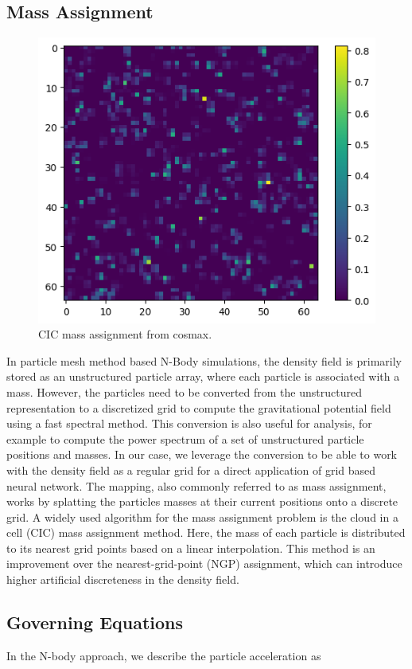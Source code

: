 \documentclass{article}
\begin{document}
\subsection{Mass Assignment}
\label{mass-assignment}

\begin{figure}[h]
    \centering
    \includegraphics[width=0.5\linewidth]{img/cic.png}
    \caption{CIC mass assignment from cosmax.}
    \label{fig:cosmax-cic}
\end{figure}


In particle mesh method based N-Body simulations, the density field is primarily stored as an unstructured particle array, where each particle is associated with a mass. However, the particles need to be converted from the unstructured representation to a discretized grid to compute the gravitational potential field using a fast spectral method. This conversion is also useful for analysis, for example to compute the power spectrum of a set of unstructured particle positions and masses. In our case, we leverage the conversion to be able to work with the density field as a regular grid for a direct application of grid based neural network. The mapping, also commonly referred to as mass assignment, works by splatting the particles masses at their current positions onto a discrete grid. A widely used algorithm for the mass assignment problem is the cloud in a cell (CIC) mass assignment method. Here, the mass of each particle is distributed to its nearest grid points based on a linear interpolation. This method is an improvement over the nearest-grid-point (NGP) assignment, which can introduce higher artificial discreteness in the density field. 

\subsection{Governing Equations}

In the N-body approach, we describe the particle acceleration as
\end{document}

